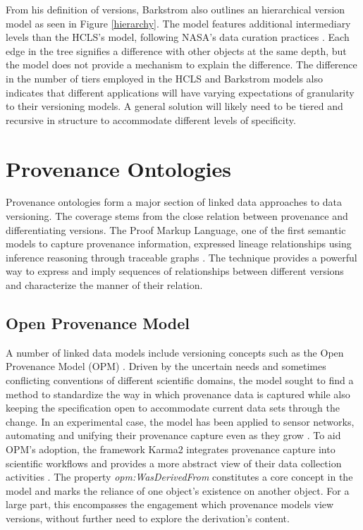 From his definition of versions, Barkstrom also outlines an hierarchical version model as seen in Figure \ref{hierarchy}.
The model features additional intermediary levels than the HCLS's model, following NASA's data curation practices \cite{barkstrom2014earth}.
Each edge in the tree signifies a difference with other objects at the same depth, but the model does not provide a mechanism to explain the difference.
The difference in the number of tiers employed in the HCLS and Barkstrom models also indicates that different applications will have varying expectations of granularity to their versioning models.
A general solution will likely need to be tiered and recursive in structure to accommodate different levels of specificity.

\section{Provenance Ontologies}

Provenance ontologies form a major section of linked data approaches to data versioning.
The coverage stems from the close relation between provenance and differentiating versions.
The Proof Markup Language, one of the first semantic models to capture provenance information, expressed lineage relationships using inference reasoning through traceable graphs \cite{daSilva2006381}.
The technique provides a powerful way to express and imply sequences of relationships between different versions and characterize the manner of their relation.

\subsection{Open Provenance Model}

A number of linked data models include versioning concepts such as the Open Provenance Model (OPM) \cite{moreau2008open}.
Driven by the uncertain needs and sometimes conflicting conventions of different scientific domains, the model sought to find a method to standardize the way in which provenance data is captured while also keeping the specification open to accommodate current data sets through the change.
In an experimental case, the model has been applied to sensor networks, automating and unifying their provenance capture even as they grow \cite{5478496}.
To aid OPM's adoption, the framework Karma2 integrates provenance capture into scientific workflows and provides a more abstract view of their data collection activities \cite{simmhan2010karma2}.
The property \textit{opm:WasDerivedFrom} constitutes a core concept in the model and marks the reliance of one object's existence on another object.
For a large part, this encompasses the engagement which provenance models view versions, without further need to explore the derivation's content.

